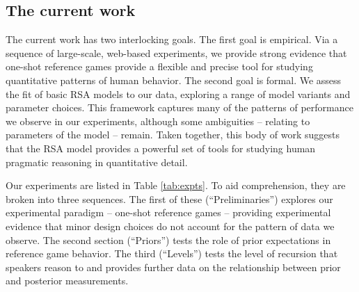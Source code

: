 \documentclass[man]{apa6}
\begin{document}
\subsection{The current work}

The current work has two interlocking goals. The first goal is empirical. Via a sequence of large-scale, web-based experiments, we provide strong evidence that one-shot reference games provide a flexible and precise tool for studying quantitative patterns of human behavior. The second goal is formal. We assess the fit of basic RSA models to our data, exploring a range of model variants and parameter choices. This framework captures many of the patterns of performance we observe in our experiments, although some ambiguities -- relating to parameters of the model -- remain. Taken together, this body of work suggests that the RSA model provides a powerful set of tools for studying human pragmatic reasoning in quantitative detail.

Our experiments are listed in Table \ref{tab:expts}. To aid comprehension, they are broken into three sequences. The first of these (``Preliminaries'') explores our experimental paradigm -- one-shot reference games -- providing experimental evidence that minor design choices do not account for the pattern of data we observe. The second section (``Priors'') tests the role of prior expectations in reference game behavior. The third (``Levels'') tests the level of recursion that speakers reason to and provides further data on the relationship between prior and posterior measurements.
\end{document}

